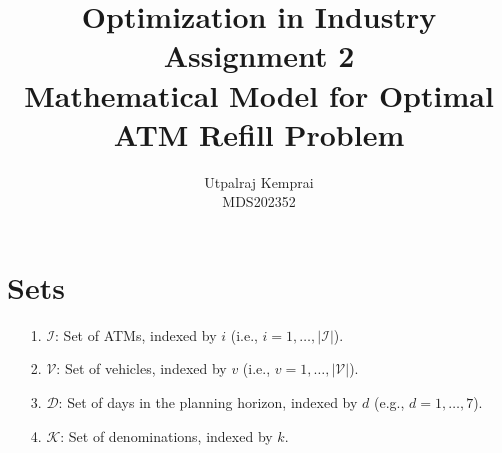 \documentclass[11pt]{article}
\begin{document}
\title{Optimization in Industry Assignment 2
\\Mathematical Model for Optimal ATM Refill Problem}
\author{Utpalraj Kemprai\\
MDS202352}
\date{}
\maketitle

\section*{Sets}
\begin{itemize}[leftmargin=1.5cm]
    \item[{1.}] \(\mathcal{I}\): Set of ATMs, indexed by \(i\) (i.e., \(i=1,\dots,|\mathcal{I}|\)).
    \item[{2.}] \(\mathcal{V}\): Set of vehicles, indexed by \(v\) (i.e., \(v=1,\dots,|\mathcal{V}|\)).
    \item[{3.}] \(\mathcal{D}\): Set of days in the planning horizon, indexed by \(d\) (e.g., \(d=1,\dots,7\)).
    \item[{4.}] \(\mathcal{K}\): Set of denominations, indexed by \(k\).
\end{itemize}
\end{document}
